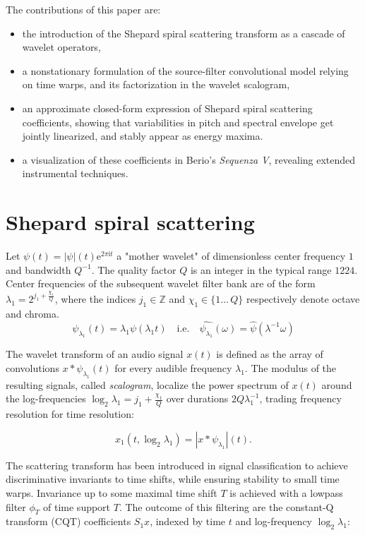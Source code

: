 \documentclass[twoside,a4paper]{article}
\begin{document}
The contributions of this paper are:
\begin{itemize}
\item
the introduction of the Shepard spiral scattering transform as a cascade of wavelet operators,
\item
a nonstationary formulation of the source-filter convolutional model relying on time warps, and its factorization in the wavelet scalogram,
\item
an approximate closed-form expression of Shepard spiral scattering coefficients, showing that variabilities in pitch and spectral envelope get jointly linearized, and stably appear as energy maxima.
\item
a visualization of these coefficients in Berio's \emph{Sequenza V}, revealing extended instrumental techniques.
\end{itemize}

\section{Shepard spiral scattering}

Let $\psi(t)=\vert\psi\vert(t)\mathrm{e}^{2\pi\mathrm{i}t}$ a "mother wavelet" of dimensionless center frequency $1$ and bandwidth $Q^{-1}$. The quality factor $Q$ is an integer in the typical range $12$\textendash$24$.
Center frequencies of the subsequent wavelet filter bank are of the
form $\lambda_{1} = 2^{j_{1} + \frac{\chi_{1}}{Q}}$, where the indices
$j_{1} \in \mathbb{Z}$ and $\chi_1 \in \{1\ldots\,Q\}$ respectively denote
octave and chroma.
\[
\psi_{\lambda_{1}}(t)=\lambda_{1}\psi(\lambda_{1}t)\quad\mathrm{i.e.}\quad\widehat{\psi_{\lambda_{1}}}(\omega)=\widehat{\psi}(\lambda^{-1}\omega)
\]

The wavelet transform of an audio signal $x(t)$ is defined as the array of convolutions $x \ast \psi_{\lambda_1}(t)$ for every audible frequency $\lambda_1$. The modulus of the resulting signals, called \emph{scalogram}, localize the power spectrum of $x(t)$ around the log-frequencies $\log_2 \lambda_1 = j_1 + \frac{\chi_1}{Q}$ over durations $2 Q \lambda_1^{-1}$, trading frequency resolution for time resolution:

\[
x_1 (t, \log_{2}\lambda_{1}) = \left| x \ast \psi_{\lambda_{1}} \right| (t).
\]

The scattering transform has been introduced in signal classification to achieve discriminative invariants to time shifts, while ensuring stability to small time warps. Invariance up to some maximal time shift $T$ is achieved with a lowpass filter $\phi_T$ of time support $T$. The outcome of this filtering are the constant-Q transform (CQT) coefficients $S_1 x$, indexed by time $t$ and log-frequency $\log_2 \lambda_1$:
\end{document}
